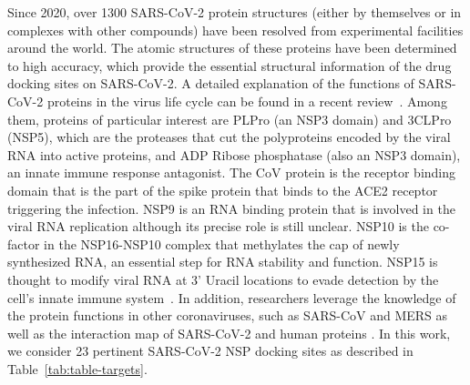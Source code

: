 \documentclass[conference]{IEEEtran}
\begin{document}
Since 2020, over 1300 SARS-CoV-2 protein structures (either by themselves or in complexes with other compounds)
have been resolved from experimental facilities around the world.
The atomic structures of these proteins have been determined to high accuracy, which provide the essential structural information of the drug docking sites on SARS-CoV-2. A detailed explanation of the functions of SARS-CoV-2 proteins in the virus life cycle can be found in a recent review~\cite{mariano2020proteins}. Among them, proteins of particular interest are PLPro (an NSP3 domain) and 3CLPro (NSP5), which are the proteases that cut the polyproteins encoded by the viral RNA into active proteins, and ADP Ribose phosphatase (also an NSP3 domain), an innate immune response antagonist. The CoV protein is the receptor binding domain that is the part of the spike protein that binds to the ACE2 receptor triggering the infection. NSP9 is an RNA binding protein that is involved in the viral RNA replication although its precise role is still unclear. NSP10 is the co-factor in the NSP16-NSP10 complex that methylates the cap of newly synthesized RNA, an essential step for RNA stability and function. NSP15 is thought to modify viral RNA at 3' Uracil locations to evade detection by the cell's innate immune system~\cite{Pillon2021}. In addition, researchers leverage the knowledge of the protein functions in other coronaviruses, such as SARS-CoV and MERS as well as the interaction map of SARS-CoV-2 and human proteins \cite{gordon2020sars}. In this work,  we consider 23 pertinent SARS-CoV-2 NSP docking sites as described in Table~\ref{tab:table-targets}.
\end{document}
